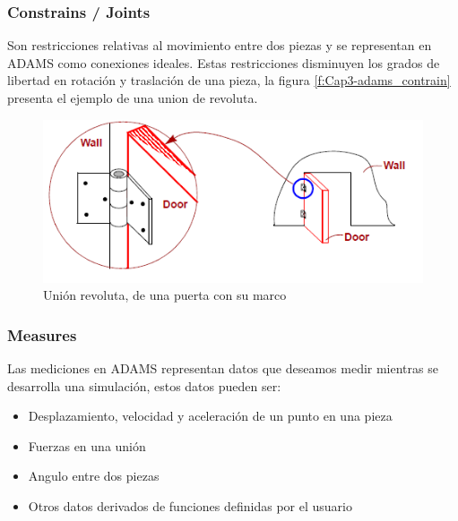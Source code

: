         
        

        
        \subsubsection{Constrains / Joints}
        
        Son restricciones relativas al movimiento entre dos piezas y se representan en ADAMS como conexiones ideales. Estas restricciones disminuyen los grados de libertad en rotación y traslación de una pieza, la figura \eqref{f:Cap3-adams_contrain} presenta el ejemplo de una union de revoluta.
        
        \begin{figure}[H]
            \centering
           \includegraphics[width=0.8\linewidth]{Main/Chapter3/Images3/papeo/constrain.png}
            \caption{Unión revoluta, de una puerta con su marco \cite{adams-basic}}
            \label{f:Cap3-adams_contrain}
        \end{figure} 
        
        \subsubsection{Measures}
        
        Las mediciones en ADAMS representan datos que deseamos medir mientras se desarrolla una simulación, estos datos pueden ser:
        
        \begin{itemize}
            \item Desplazamiento, velocidad y aceleración de un punto en una pieza
            \item Fuerzas en una unión
            \item Angulo entre dos piezas
            \item Otros datos derivados de funciones definidas por el usuario
        \end{itemize}
        
